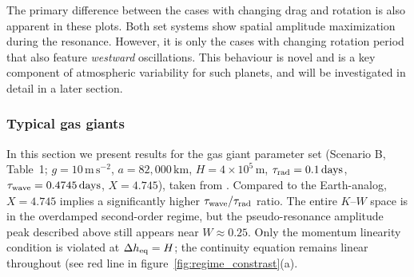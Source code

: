\documentclass[trackchanges,twocolumn]{aastex7}
\begin{document}
The primary difference between the cases with changing drag and rotation is also apparent in these plots. Both set systems show spatial amplitude maximization during the resonance. However, it is only the cases with changing rotation period that also feature \textit{westward} oscillations. This behaviour is novel and is a key component of atmospheric variability for such planets, and will be investigated in detail in a later section.


\subsubsection{Typical gas giants}
\label{sec:hot_jupiter}

In this section we present results for the gas giant parameter set (Scenario B, Table~1; $g=10\,\mathrm{m\,s^{-2}}$, $a=82{,}000\,\mathrm{km}$, $H=4\times10^{5}\,\mathrm{m}$, $\tau_{\rm rad}=0.1\,\mathrm{days}$, $\tau_{\rm wave}=0.4745\,\mathrm{days}$, $X=4.745$), taken from \cite{perez2013atmospheric}. Compared to the Earth-analog, $X=4.745$ implies a significantly higher $\tau_{\rm wave}/\tau_{\rm rad}$ ratio. The entire $K$--$W$ space is in the overdamped second-order regime, but the pseudo-resonance amplitude peak described above still appears near $W \approx 0.25$. Only the momentum linearity condition is violated at $\Delta h_{\rm eq} = H$; the continuity equation remains linear throughout (see red line in figure~\ref{fig:regime_constrast}(a). 
\end{document}
